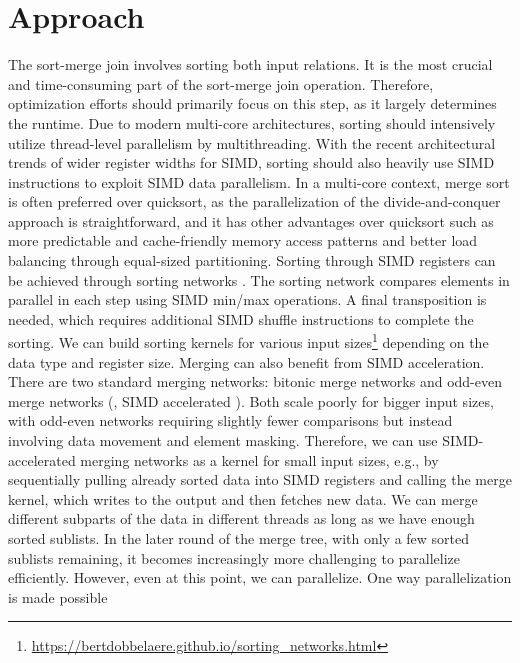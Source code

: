 \section{Approach}
\label{sec:approach}


The sort-merge join involves sorting both input relations. It is the most crucial and 
time-consuming part of the sort-merge join operation. Therefore, optimization efforts should
primarily focus on this step, as it largely determines the runtime. Due to modern multi-core 
architectures, sorting should intensively utilize thread-level parallelism by multithreading.
With the recent architectural trends of wider register widths for SIMD, sorting should also
heavily use SIMD instructions to exploit SIMD data parallelism. In a multi-core context, merge
sort is often preferred over quicksort, as the parallelization of the divide-and-conquer approach
is straightforward, and it has other advantages over quicksort such as more predictable and 
cache-friendly memory access patterns and better load balancing through equal-sized partitioning. 
Sorting through SIMD registers can be achieved through sorting networks \cite{10.1145/1468075.1468121}.
The sorting network compares elements in parallel in each step using SIMD min/max operations. 
A final transposition is needed, which requires additional SIMD shuffle instructions to complete
the sorting. We can build
sorting kernels for various input sizes\footnote{\url{https://bertdobbelaere.github.io/sorting_networks.html}} depending on the data type and register size. Merging can
also benefit from SIMD acceleration. There are two standard merging networks: bitonic merge networks
and odd-even merge networks (\cite{10.1145/1468075.1468121}, SIMD accelerated \cite{4336211}). Both scale poorly for bigger input sizes, with odd-even networks 
requiring slightly fewer comparisons but instead involving data movement and element masking.
Therefore, we can use SIMD-accelerated merging networks as a kernel for small input sizes, e.g., by
sequentially pulling already sorted data into SIMD registers and calling the merge kernel, which 
writes to the output and then fetches new data. We can merge different subparts of the data in
different threads as long as we have enough sorted sublists. In the later round of the merge tree,
with only a few sorted sublists remaining, it becomes increasingly more challenging to parallelize
efficiently. However, even at this point, we can parallelize. One way parallelization is made possible 

